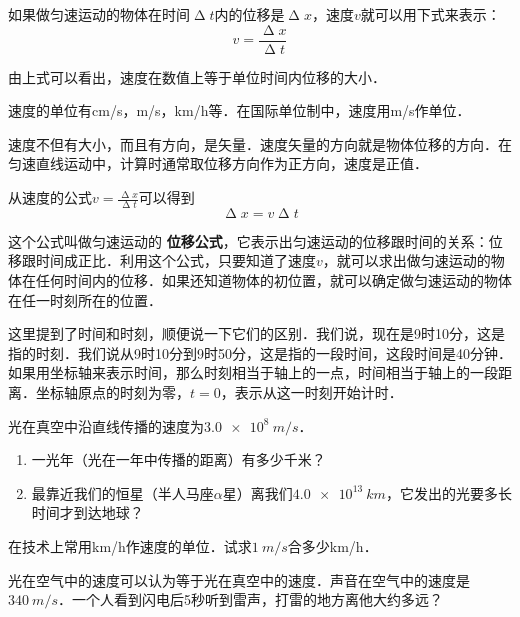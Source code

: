 如果做匀速运动的物体在时间$\upDelta t$内的位移是$\upDelta x$，速度$v$就可以用下式来表示：
\begin{equation}
    v=\frac{\upDelta x}{\upDelta t}
\end{equation}

由上式可以看出，速度在数值上等于单位时间内位移的大小．

速度的单位有\si{cm/s}，\si{m/s}，\si{km/h}等．在国际单位制中，速度用\si{m/s}作单位．

速度不但有大小，而且有方向，是矢量．速度矢量的方向就是物体位移的方向．在匀速直线运动中，计算时通常取位移方向作为正方向，速度是正值．

从速度的公式$v=\frac{\upDelta x}{\upDelta t}$可以得到
\begin{equation}
    \upDelta x=v\upDelta t
\end{equation}

这个公式叫做匀速运动的\textbf{ 位移公式}，它表示出匀速运动的位移跟时间的关系：位移跟时间成正比．利用这个公式，只要知道了速度$v$，就可以求出做匀速运动的物体在任何时间内的位移．如果还知道物体的初位置，就可以确定做匀速运动的物体在任一时刻所在的位置．

这里提到了时间和时刻，顺便说一下它们的区别．我们说，现在是9时10分，这是指的时刻．我们说从9时10分到9时50分，这是指的一段时间，这段时间是40分钟．如果用坐标轴来表示时间，那么时刻相当于轴上的一点，时间相当于轴上的一段距离．坐标轴原点的时刻为零，$t=0$，表示从这一时刻开始计时．




\begin{Exercise}
	\begin{QsNum}
	    \item 光在真空中沿直线传播的速度为$\qty{3.0e8}{m/s}$．
	          \begin{enumerate}
	              \item 一光年（光在一年中传播的距离）有多少千米？
	              \item 最靠近我们的恒星（半人马座$\alpha$星）离我们$\qty{4.0e13}{km}$，它发出的光要多长时间才到达地球？
	          \end{enumerate}
	    \item  在技术上常用\si{km/h}作速度的单位．试求$\qty{1}{m/s}$合多少\si{km/h}．
	    \item 光在空气中的速度可以认为等于光在真空中的速度．声音在空气中的速度是$\qty{340}{m/s}$．一个人看到闪电后5秒听到雷声，打雷的地方离他大约多远？
	\end{QsNum}
\end{Exercise}



